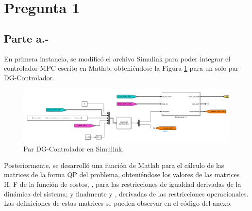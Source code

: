 %
%


\newcommand{\explorelite}{\textit{explore\_lite}}
\newcommand{\movebase}{\textit{move\_base}}



\section{Pregunta 1}

\subsection{Parte a.-}

En primera instancia, se modificó el archivo Simulink para poder integrar el controlador MPC escrito en Matlab, obteniéndose la Figura \ref{mpc_individual} para un solo par DG-Controlador. 

\begin{figure}
   \centering
   \includegraphics[width=0.5\linewidth]{Tarea 4/report/imagenes/p1a/dmpc_simulink.png}
   
   \caption{Par DG-Controlador en Simulink.}
   \label{mpc_individual}
\end{figure}

Posteriormente, se desarrolló una función de Matlab para el cálculo de las matrices de la forma QP del problema,  obteniéndose los valores de las matrices H, F de la función de costos, ,  para las restricciones de igualdad derivadas de la dinámica del sistema; y finalmente  y , derivadas de las restricciones operacionales. Las definiciones de estas matrices se pueden observar en el código del anexo.

